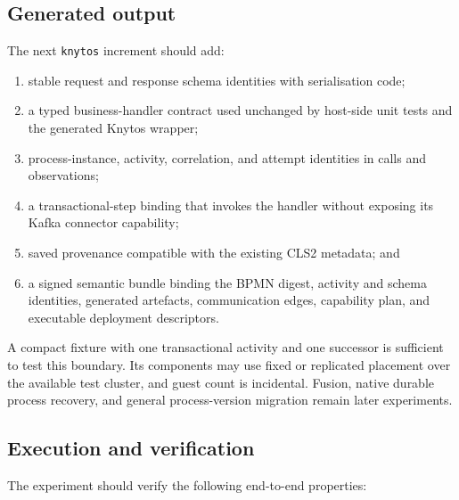 \subsection{Generated output}

The next \texttt{knytos} increment should add:

\begin{enumerate}
    \item stable request and response schema identities with serialisation code;
    \item a typed business-handler contract used unchanged by host-side unit
        tests and the generated Knytos wrapper;
    \item process-instance, activity, correlation, and attempt identities in
        calls and observations;
    \item a transactional-step binding that invokes the handler without
        exposing its Kafka connector capability;
    \item saved provenance compatible with the existing CLS2 metadata; and
    \item a signed semantic bundle binding the BPMN digest, activity and schema
        identities, generated artefacts, communication edges, capability plan,
        and executable deployment descriptors.
\end{enumerate}

A compact fixture with one transactional activity and one successor is
sufficient to test this boundary. Its components may use fixed or replicated
placement over the available test cluster, and guest count is incidental. Fusion,
native durable process recovery, and general process-version migration remain
later experiments.

\subsection{Execution and verification}

The experiment should verify the following end-to-end properties:

